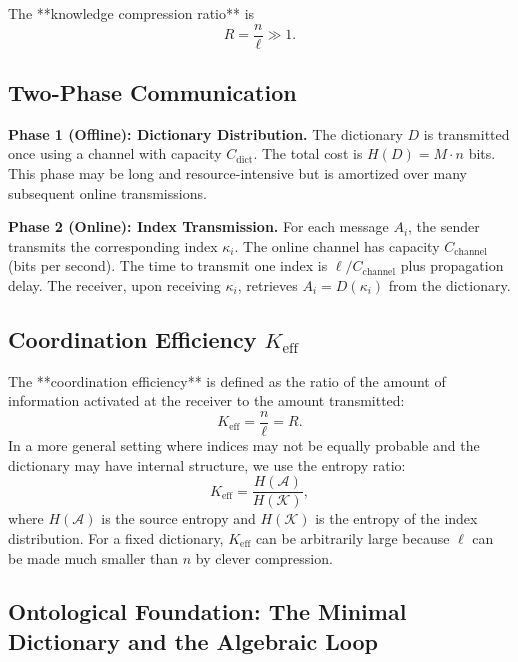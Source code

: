 \documentclass[12pt,a4paper]{article}
\theoremstyle{remark}
\newcommand{\Keff}{K_{\mathrm{eff}}}
\begin{document}
	The **knowledge compression ratio** is
	\begin{equation}
		R = \frac{n}{\ell} \gg 1.
	\end{equation}
	
	\subsection{Two-Phase Communication}
	
	\textbf{Phase 1 (Offline): Dictionary Distribution.} The dictionary $D$ is transmitted once using a channel with capacity $C_{\text{dict}}$. The total cost is $H(D) = M \cdot n$ bits. This phase may be long and resource-intensive but is amortized over many subsequent online transmissions.
	
	\textbf{Phase 2 (Online): Index Transmission.} For each message $A_i$, the sender transmits the corresponding index $\kappa_i$. The online channel has capacity $C_{\text{channel}}$ (bits per second). The time to transmit one index is $\ell / C_{\text{channel}}$ plus propagation delay. The receiver, upon receiving $\kappa_i$, retrieves $A_i = D(\kappa_i)$ from the dictionary.
	
	\subsection{Coordination Efficiency \texorpdfstring{$\Keff$}{K\_eff}}
	\label{sec:keff-def}
	
	The **coordination efficiency** is defined as the ratio of the amount of information activated at the receiver to the amount transmitted:
	\begin{equation}
		\Keff = \frac{n}{\ell} = R. \label{eq:keff-def}
	\end{equation}
	In a more general setting where indices may not be equally probable and the dictionary may have internal structure, we use the entropy ratio:
	\begin{equation}
		\Keff = \frac{H(\mathcal{A})}{H(\mathcal{K})},
	\end{equation}
	where $H(\mathcal{A})$ is the source entropy and $H(\mathcal{K})$ is the entropy of the index distribution. For a fixed dictionary, $\Keff$ can be arbitrarily large because $\ell$ can be made much smaller than $n$ by clever compression.
	
	\subsection{Ontological Foundation: The Minimal Dictionary and the Algebraic Loop}
	\label{subsec:minimal-dict}
	
\end{document}
